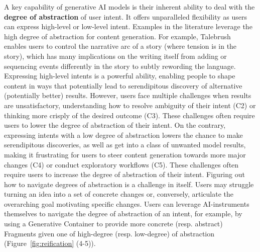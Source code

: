 A key capability of generative AI models is their inherent ability to deal with the \textbf{degree of abstraction} of user intent. It offers unparalleled flexibility as users can express high-level or low-level intent. Examples in the literature leverage the high degree of abstraction for content generation. For example, Talebrush~\cite{chung_talebrush_2022} enables users to control the narrative arc of a story (where tension is in the story), which has many implications on the writing itself from adding or sequencing events differently in the story to subtly rewording the language.  Expressing high-level intents is a powerful ability, enabling people to shape content 
in ways that potentially lead to serendipitous discovery of alternative (potentially better) results. However, users face multiple challenges when results are unsatisfactory, understanding how to resolve ambiguity of their intent (C2) or thinking more crisply of the desired outcome (C3). These challenges often require users to lower the degree of abstraction of their intent. On the contrary, expressing intents with a low degree of abstraction lowers the chance to make serendipitous discoveries, as well as get into a class of unwanted model results, making it frustrating for users to steer content generation towards more major changes (C4) or conduct exploratory workflows (C5). These challenges often require users to increase the degree of abstraction of their intent. Figuring out how to navigate degrees of abstraction is a challenge in itself. Users may struggle turning an idea into a set of concrete changes or, conversely, articulate the overarching goal motivating specific changes. Users can leverage AI-instruments themselves to navigate the degree of abstraction of an intent, for example, by using a Generative Container to provide more concrete (resp. abstract) Fragments given one of high-degree (resp. low-degree) of abstraction (Figure~\ref{fig:reification} (4-5)).


